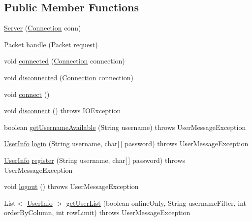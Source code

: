 \subsection*{Public Member Functions}
\begin{DoxyCompactItemize}
\item 
\hyperlink{classclient_1_1conn_1_1_server_aea9f06e94bc3d3653c06b192ba097a14}{Server} (\hyperlink{classsharedlib_1_1conn_1_1_connection}{Connection} conn)
\item 
\hyperlink{classsharedlib_1_1conn_1_1_packet}{Packet} \hyperlink{classclient_1_1conn_1_1_server_a620def50e5115d3798407dfff5433ead}{handle} (\hyperlink{classsharedlib_1_1conn_1_1_packet}{Packet} request)
\item 
void \hyperlink{classclient_1_1conn_1_1_server_ac8ad09c9052bfb32e082493ada8d14ab}{connected} (\hyperlink{classsharedlib_1_1conn_1_1_connection}{Connection} connection)
\item 
void \hyperlink{classclient_1_1conn_1_1_server_ae2a0ab226b1622da8e19137fb89bdc81}{disconnected} (\hyperlink{classsharedlib_1_1conn_1_1_connection}{Connection} connection)
\item 
void \hyperlink{classclient_1_1conn_1_1_server_a7e96a6bd486520d128a37a8216cf37c3}{connect} ()
\item 
void \hyperlink{classclient_1_1conn_1_1_server_ab69a81693f41986321e92120aa0918cb}{disconnect} ()  throws I\+O\+Exception 
\item 
boolean \hyperlink{classclient_1_1conn_1_1_server_ab25d4a9f33372c404d2464d1b608dd77}{get\+Username\+Available} (String username)  throws User\+Message\+Exception 
\item 
\hyperlink{classsharedlib_1_1tuples_1_1_user_info}{User\+Info} \hyperlink{classclient_1_1conn_1_1_server_a064556a987ee40eb0a91a952ae08969f}{login} (String username, char\mbox{[}$\,$\mbox{]} password)  throws User\+Message\+Exception 
\item 
\hyperlink{classsharedlib_1_1tuples_1_1_user_info}{User\+Info} \hyperlink{classclient_1_1conn_1_1_server_a945189dab00f6350cb5a444a910c4dd5}{register} (String username, char\mbox{[}$\,$\mbox{]} password)  throws User\+Message\+Exception 
\item 
void \hyperlink{classclient_1_1conn_1_1_server_af45689754d02a83d53602d01a9bf2427}{logout} ()  throws User\+Message\+Exception 
\item 
List$<$ \hyperlink{classsharedlib_1_1tuples_1_1_user_info}{User\+Info} $>$ \hyperlink{classclient_1_1conn_1_1_server_a8512a2e59d7e29fb25b913220050060d}{get\+User\+List} (boolean online\+Only, String username\+Filter, int order\+By\+Column, int row\+Limit)  throws User\+Message\+Exception 

\end{DoxyCompactItemize}
